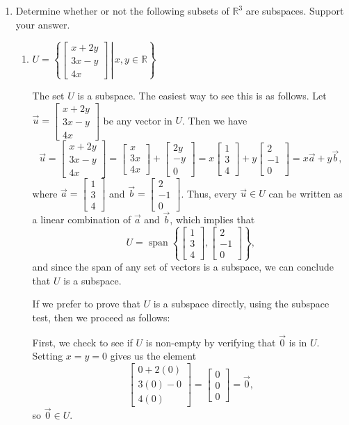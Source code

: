 \documentclass[letterpaper,12pt]{amsart}
\newcommand{\R}{\mathbb{R}}
\newcommand{\bbm}{\begin{bmatrix}}
\newcommand{\ebm}{\end{bmatrix}}
\begin{document}
\begin{enumerate}
 \item Determine whether or not the following subsets of $\R^3$ are subspaces. Support your answer.

\medskip


\begin{enumerate}
 \item $U = \left\{\left.\bbm x+2y\\3x-y\\4x\ebm \,\right|\, x,y\in\R\right\}$

\bigskip

The set $U$ is a subspace. The easiest way to see this is as follows. Let $\vec{u}=\bbm x+2y\\3x-y\\4x\ebm$ be any vector in $U$. Then we have
\[
 \vec{u} = \bbm x+2y\\3x-y\\4x\ebm = \bbm x\\3x\\4x\ebm + \bbm 2y\\-y\\0\ebm = x\bbm 1\\3\\4\ebm+y\bbm 2\\-1\\0\ebm = x\vec{a}+y\vec{b},
\]
where $\vec{a} = \bbm 1\\3\\4\ebm$ and $\vec{b} = \bbm 2\\-1\\0\ebm$. Thus, every $\vec{u}\in U$ can be written as a linear combination of $\vec{a}$ and $\vec{b}$, which implies that
\[
 U = \operatorname{span}\left\{\bbm 1\\3\\4\ebm, \bbm 2\\-1\\0\ebm\right\},
\]
and since the span of any set of vectors is a subspace, we can conclude that $U$ is a subspace.

\bigskip

If we prefer to prove that $U$ is a subspace directly, using the subspace test, then we proceed as follows:

First, we check to see if $U$ is non-empty by verifying that $\vec{0}$ is in $U$. Setting $x=y=0$ gives us the element
\[
 \bbm 0+2(0)\\3(0)-0\\4(0)\ebm = \bbm 0\\0\\0\ebm = \vec{0},
\]
so $\vec{0}\in U$.


\end{enumerate}
\end{enumerate}
\end{document}
